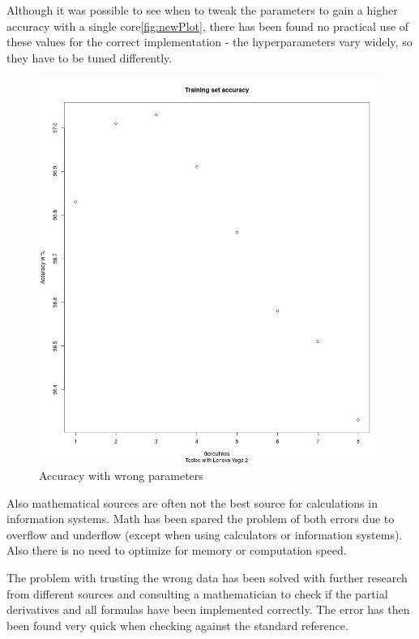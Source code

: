\documentclass[11pt]{article}
\begin{document}
\newpage
Although it was possible to see when to tweak the parameters to gain a higher accuracy with a single core\autoref{fig:newPlot}, there has been found no practical use of these values for the correct implementation - the hyperparameters vary widely, so they have to be tuned differently.
\begin{figure}[H]
	\includegraphics[width=1.0\textwidth, height=0.75\textheight]{./Data/WrongMath/Images/newPlot.jpg}
	\vspace{-1em}
	\caption{Accuracy with wrong parameters}
	\vspace{-0.5em}
	\label{fig:newPlot}
\end{figure}

Also mathematical sources are often not the best source for calculations in information systems. Math has been spared the problem of both errors due to overflow and underflow (except when using calculators or information systems). Also there is no need to optimize for memory or computation speed.

The problem with trusting the wrong data has been solved with further research from different sources and consulting a mathematician to check if the partial derivatives and all formulas have been implemented correctly. The error has then been found very quick when checking against the standard reference\cite{GoodfellowEtAl2016}.
\end{document}
